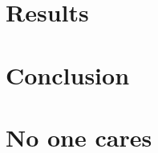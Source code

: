 \documentclass[12pt, a4paper]{report}
\begin{document}
\chapter{Results}

\chapter{Conclusion}

\appendix
\chapter{No one cares}

\sloppy

\end{document}
